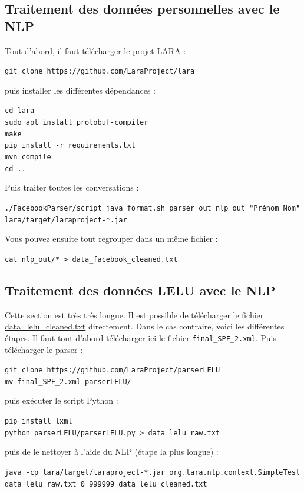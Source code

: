 \documentclass[10pt,a4paper]{article}
\begin{document}
\subsection{Traitement des données personnelles avec le NLP}
Tout d'abord, il faut télécharger le projet LARA :
\begin{center}
\texttt{git clone https://github.com/LaraProject/lara}
\end{center}
puis installer les différentes dépendances :
\begin{center}
\texttt{cd lara} \\
\texttt{sudo apt install protobuf-compiler} \\
\texttt{make} \\
\texttt{pip install -r requirements.txt} \\
\texttt{mvn compile} \\
\texttt{cd ..} \\
\end{center}
Puis traiter toutes les conversations :
\begin{center}
\texttt{./FacebookParser/script\_java\_format.sh parser\_out nlp\_out "Prénom Nom" lara/target/laraproject-*.jar}
\end{center}
Vous pouvez ensuite tout regrouper dans un même fichier :
\begin{center}
\texttt{cat nlp\_out/* > data\_facebook\_cleaned.txt}
\end{center}
\subsection{Traitement des données LELU avec le NLP}
Cette section est très très longue. Il est possible de télécharger le fichier \href{https://drive.google.com/file/d/1suiEo0mGBEszMhmesoj-82Nywy2R7guF/view?usp=sharing}{data\_lelu\_cleaned.txt} directement. Dans le cas contraire, voici les différentes étapes. Il faut tout d'abord télécharger \href{https://www.kaggle.com/breandan/french-reddit-discussion}{ici} le fichier \texttt{final\_SPF\_2.xml}. Puis télécharger le parser :
\begin{center}
\texttt{git clone https://github.com/LaraProject/parserLELU} \\
\texttt{mv final\_SPF\_2.xml parserLELU/}
\end{center}
puis exécuter le script Python :
\begin{center}
\texttt{pip install lxml} \\
\texttt{python parserLELU/parserLELU.py > data\_lelu\_raw.txt}
\end{center}
puis de le nettoyer à l'aide du NLP (étape la plus longue) :
\begin{center}
\texttt{java -cp lara/target/laraproject-*.jar org.lara.nlp.context.SimpleTest data\_lelu\_raw.txt 0 999999 data\_lelu\_cleaned.txt}
\end{center}
\end{document}
